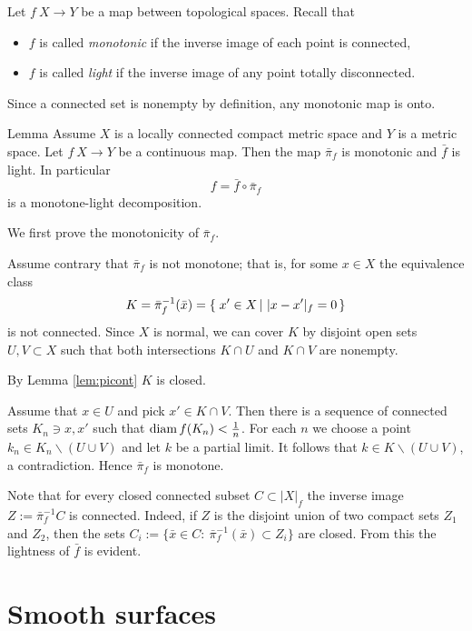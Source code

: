 \documentclass{article}
\begin{document}
Let $f\:X\to Y$ be a map between topological spaces.
Recall that 
\begin{itemize}
\item $f$ is called \emph{monotonic} if the inverse image of each point is connected,
 \item $f$ is called \emph{light} if the inverse image of any point totally disconnected.
\end{itemize}
Since a connected set is nonempty by definition, any monotonic map is onto.

\begin{thm}{Lemma}\label{cor:fiberconnected}
Assume $X$ is a locally connected compact metric space and $Y$ is a metric space.
Let $f\:X\to Y$ be a continuous map.
Then the map $\bar \pi_f$ is monotonic and $\bar f$ is light.
In particular 
\[f=\bar f\circ\bar\pi_f\]
is a monotone-light decomposition. 
\end{thm}

We first prove the monotonicity of $\bar\pi_f$.

Assume contrary that $\bar\pi_f$ is not monotone;
that is, for some $x\in X$ the equivalence class 
\[K=\bar\pi_f^{-1}(\bar x)=\set{x'\in X}{|x-x'|_f=0}\]
is not connected. Since $X$ is normal, we
can cover $K$ by disjoint open sets $U,V\subset X$ such that both intersections
$K\cap U$ and $K\cap V$ are nonempty.

By Lemma \ref{lem:picont} $K$ is closed.

Assume that $x\in U$ and pick $x'\in K\cap V$.
Then there is a sequence of connected sets $K_n\ni x,x'$ such that $\mathop{\rm diam}\nolimits f(K_n)<\tfrac1n$.
For each $n$ we choose a point $k_n\in K_n\backslash (U\cup V)$ and let $k$ be a partial limit.
It follows that $k\in K\backslash (U\cup V)$, a contradiction. Hence $\bar\pi_f$ is monotone.

Note that for every closed connected subset $C\subset |X|_f$ the inverse image $Z:=\bar\pi_f^{-1}C$ is
connected. Indeed, if $Z$ is the disjoint union of two compact sets $Z_1$ and $Z_2$, then the sets 
$C_i:=\{\bar x\in C:\ \bar\pi_f^{-1}(\bar x)\subset Z_i\}$ are closed.
From this the lightness of $\bar f$ is evident.

\qeds








\section{Smooth surfaces}\label{sec:smooth}
\end{document}
